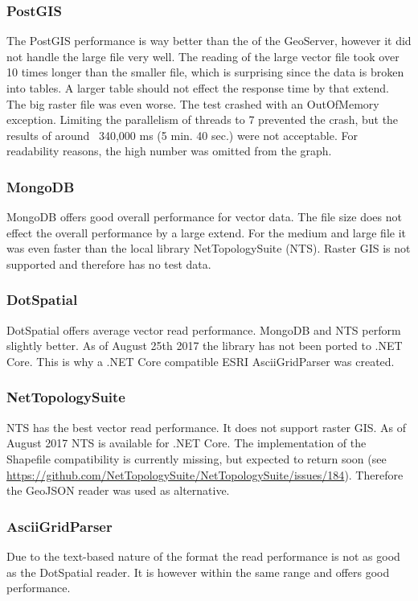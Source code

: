 \subsubsection{PostGIS}
The PostGIS performance is way better than the of the GeoServer, however it did not handle the large file very well. The reading of the large vector file took over 10 times longer than the smaller file, which is surprising since the data is broken into tables. A larger table should not effect the response time by that extend.\\
The big raster file was even worse. The test crashed with an OutOfMemory exception. Limiting the parallelism of threads to 7 prevented the crash, but the results of around ~340,000 ms (5 min. 40 sec.) were not acceptable. For readability reasons, the high number was omitted from the graph.

\subsubsection{MongoDB}
MongoDB offers good overall performance for vector data. The file size does not effect the overall performance by a large extend. For the medium and large file it was even faster than the local library NetTopologySuite (NTS). Raster GIS is not supported and therefore has no test data.

\subsubsection{DotSpatial}
DotSpatial offers average vector read performance. MongoDB and NTS perform slightly better. As of August 25th 2017 the library has not been ported to .NET Core. This is why a .NET Core compatible ESRI AsciiGridParser was created.

\subsubsection{NetTopologySuite}
NTS has the best vector read performance. It does not support raster GIS. As of August 2017 NTS is available for .NET Core. The implementation of the Shapefile compatibility is currently missing, but expected to return soon (see \url{https://github.com/NetTopologySuite/NetTopologySuite/issues/184}). Therefore the GeoJSON reader was used as alternative.

\subsubsection{AsciiGridParser}
Due to the text-based nature of the format the read performance is not as good as the DotSpatial reader. It is however within the same range and offers good performance.


